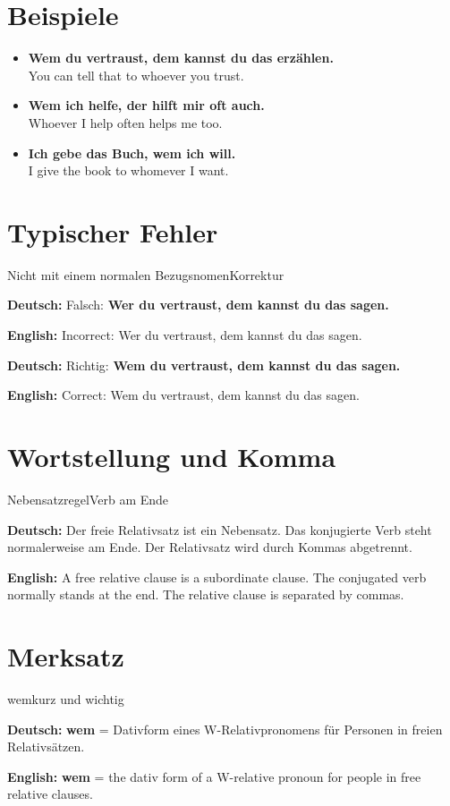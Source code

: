 \documentclass[a4paper,11pt]{article}
\newcommand{\GermanText}[1]{\textbf{Deutsch: }#1\par}
\newcommand{\EnglishText}[1]{{\small\color{SoftGray}\textbf{English: }#1\par}}
\newcommand{\ExampleItem}[2]{\item \textbf{#1}\\{\small\color{SoftGray}#2}}
\begin{document}
\section{Beispiele}

\begin{exbox}

\begin{itemize}

\ExampleItem{Wem du vertraust, dem kannst du das erzählen.}{You can tell that to whoever you trust.}

\ExampleItem{Wem ich helfe, der hilft mir oft auch.}{Whoever I help often helps me too.}

\ExampleItem{Ich gebe das Buch, wem ich will.}{I give the book to whomever I want.}

\end{itemize}

\end{exbox}

\section{Typischer Fehler}

\begin{grammarentry}{Nicht mit einem normalen Bezugsnomen}{Korrektur}

\GermanText{Falsch: \textbf{Wer du vertraust, dem kannst du das sagen.}}

\EnglishText{Incorrect: Wer du vertraust, dem kannst du das sagen.}

\GermanText{Richtig: \textbf{Wem du vertraust, dem kannst du das sagen.}}

\EnglishText{Correct: Wem du vertraust, dem kannst du das sagen.}

\end{grammarentry}

\section{Wortstellung und Komma}

\begin{grammarentry}{Nebensatzregel}{Verb am Ende}

\GermanText{Der freie Relativsatz ist ein Nebensatz. Das konjugierte Verb steht normalerweise am Ende. Der Relativsatz wird durch Kommas abgetrennt.}

\EnglishText{A free relative clause is a subordinate clause. The conjugated verb normally stands at the end. The relative clause is separated by commas.}

\end{grammarentry}

\section{Merksatz}

\begin{grammarentry}{wem}{kurz und wichtig}

\GermanText{\textbf{wem} = Dativform eines W-Relativpronomens für Personen in freien Relativsätzen.}

\EnglishText{\textbf{wem} = the dativ form of a W-relative pronoun for people in free relative clauses.}

\end{grammarentry}
\end{document}
